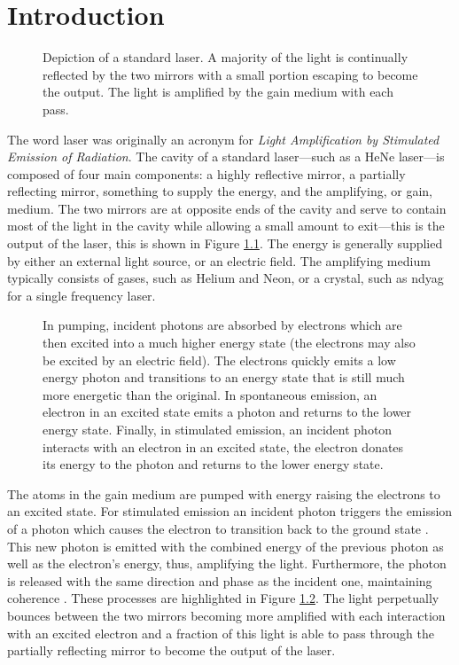 
\chapter{Introduction}

\begin{figure}[tbp]
\centering

\caption{Depiction of a standard laser. A majority of the light is continually reflected by the two mirrors with a small portion escaping to become the output. The light is amplified by the gain medium with each pass.}
\label{fig:laser}
\end{figure}

The word laser was originally an acronym for \emph{Light Amplification by Stimulated Emission of Radiation}. The cavity of a standard laser---such as a HeNe laser---is composed of four main components: a highly reflective mirror, a partially reflecting mirror, something to supply the energy, and the amplifying, or gain, medium. The two mirrors are at opposite ends of the cavity and serve to contain most of the light in the cavity while allowing a small amount to exit---this is the output of the laser, this is shown in Figure \ref{fig:laser}. The energy is generally supplied by either an external light source, or an electric field. The amplifying medium typically consists of gases, such as Helium and Neon, or a crystal, such as \gls{ndyag} for a single frequency laser. \\

\begin{figure}[tbp]
\centering

\caption[Comparison of pumping, spontaneous emission, and stimulated emission.]{In pumping, incident photons are absorbed by electrons which are then excited into a much higher energy state (the electrons may also be excited by an electric field). The electrons quickly emits a low energy photon and transitions to an energy state that is still much more energetic than the original. In spontaneous emission, an electron in an excited state emits a photon and returns to the lower energy state. Finally, in stimulated emission, an incident photon interacts with an electron in an excited state, the electron donates its energy to the photon and returns to the lower energy state.}
\label{fig:emission}
\end{figure}

The atoms in the gain medium are pumped with energy raising the electrons to an excited state. For stimulated emission an incident photon triggers the emission of a photon which causes the electron to transition back to the ground state \cite{alazzawi}. This new photon is emitted with the combined energy of the previous photon as well as the electron's energy, thus, amplifying the light. Furthermore, the photon is released with the same direction and phase as the incident one, maintaining coherence \cite{alazzawi}. These processes are highlighted in Figure \ref{fig:emission}. The light perpetually bounces between the two mirrors becoming more amplified with each interaction with an excited electron and a fraction of this light is able to pass through the partially reflecting mirror to become the output of the laser. \\

